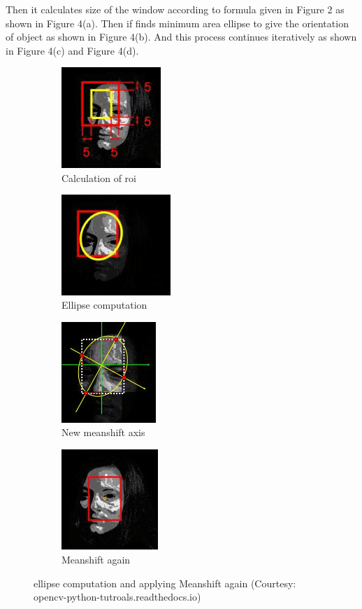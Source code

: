 \documentclass[11pt,a4paper]{article}
\begin{document}
				Then it calculates size of the window according to formula given in Figure 2 as shown in Figure 4(a). Then if finds minimum area ellipse to give the orientation of object as shown in Figure 4(b). And this process continues iteratively as shown in Figure 4(c) and Figure 4(d). 
				\begin{figure}[h!]
					\begin{subfigure}{0.5\textwidth}
						\includegraphics[width=0.9\linewidth, height=3.8cm]{../Images/roiforellipse.png}
						\caption{Calculation of roi}
					\end{subfigure}
					\begin{subfigure}{0.5\textwidth}
						\includegraphics[width=0.9\linewidth, height=3.8cm]{../Images/ellipsecomputation.png}
						\caption{Ellipse computation}
					\end{subfigure}
					\begin{subfigure}{0.5\textwidth}
						\includegraphics[width=0.9\linewidth, height=3.8cm]{../Images/newmeanshiftaxis.png} 
						\caption{New meanshift axis}
					\end{subfigure}
					\begin{subfigure}{0.5\textwidth}
						\includegraphics[width=0.9\linewidth, height=3.8cm]{../Images/meanshiftagain.png}
						\caption{Meanshift again}
					\end{subfigure}
					\caption{ellipse computation and applying Meanshift again (Courtesy: opencv-python-tutroals.readthedocs.io)}
				\end{figure}
				
\end{document}
